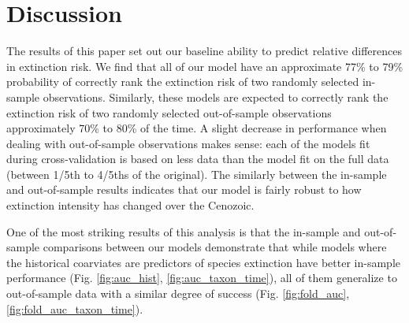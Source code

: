 \documentclass[12pt,letterpaper]{article}
\begin{document}
%
%
%



\section{Discussion}

The results of this paper set out our baseline ability to predict relative differences in extinction risk. We find that all of our model have an approximate 77\% to 79\% probability of correctly rank the extinction risk of two randomly selected in-sample observations. Similarly, these models are expected to correctly rank the extinction risk of two randomly selected out-of-sample observations approximately 70\% to 80\% of the time. A slight decrease in performance when dealing with out-of-sample observations makes sense: each of the models fit during cross-validation is based on less data than the model fit on the full data (between 1/5th to 4/5ths of the original). The similarly between the in-sample and out-of-sample results indicates that our model is fairly robust to how extinction intensity has changed over the Cenozoic.

One of the most striking results of this analysis is that the in-sample and out-of-sample comparisons between our models demonstrate that while models where the historical coarviates are predictors of species extinction have better in-sample performance (Fig. \ref{fig:auc_hist}, \ref{fig:auc_taxon_time}), all of them generalize to out-of-sample data with a similar degree of success (Fig. \ref{fig:fold_auc}, \ref{fig:fold_auc_taxon_time}).
\end{document}
